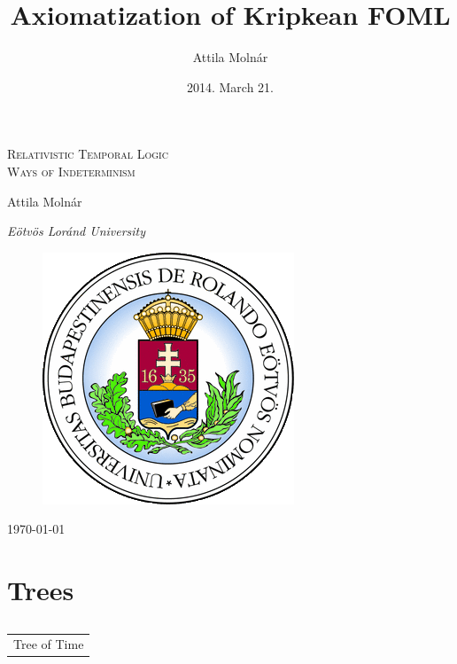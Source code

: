 \documentclass[xcolor=x11names]{beamer}
\author{Attila Moln\'ar}
\date{2014. March 21.}
\title{Axiomatization of Kripkean FOML}
\institute{ELTE}
\makeatletter
\let\beamer@writeslidentry@miniframeson=\beamer@writeslidentry
\def\beamer@writeslidentry@miniframesoff{%
  \expandafter\beamer@ifempty\expandafter{\beamer@framestartpage}{}%
  {%
    \clearpage\beamer@notesactions%
  }
}
\newcommand*{\miniframeson}{\let\beamer@writeslidentry=\beamer@writeslidentry@miniframeson}
\newcommand*{\miniframesoff}{\let\beamer@writeslidentry=\beamer@writeslidentry@miniframesoff}
\newcommand{\cimdia}[1] {\miniframesoff \begin{frame}\begin{center}\huge \begin{tabular}{c}#1\end{tabular}\end{center}\end{frame}\miniframeson}
\newcommand{\szakasz}[2][]{\section{#1}\subsection{}\cimdia{#2}}
\makeatother
\begin{document}
\footnotesize


\begin{frame}
\centering
\textsc{\Large Relativistic Temporal Logic \\[1em] Ways of Indeterminism}

\bigskip

{ \small Attila Moln\'ar

    \textit{E\"otv\"os Lor\'and University}}

 \begin{figure}
\includegraphics[scale=.3]{elte_cimer.png}
 \end{figure}

	\today
\end{frame}


\szakasz[Trees]{Tree of Time}
\end{document}
